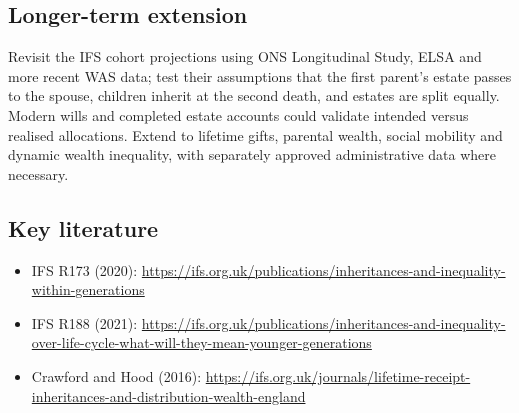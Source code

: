 \subsection{Longer-term extension}
Revisit the IFS cohort projections using ONS Longitudinal Study, ELSA and more recent WAS data; test their assumptions that the first parent's estate passes to the spouse, children inherit at the second death, and estates are split equally. Modern wills and completed estate accounts could validate intended versus realised allocations. Extend to lifetime gifts, parental wealth, social mobility and dynamic wealth inequality, with separately approved administrative data where necessary.

\subsection{Key literature}
\begin{itemize}[nosep]
\item IFS R173 (2020): \url{https://ifs.org.uk/publications/inheritances-and-inequality-within-generations}
\item IFS R188 (2021): \url{https://ifs.org.uk/publications/inheritances-and-inequality-over-life-cycle-what-will-they-mean-younger-generations}
\item Crawford and Hood (2016): \url{https://ifs.org.uk/journals/lifetime-receipt-inheritances-and-distribution-wealth-england}
\end{itemize}
